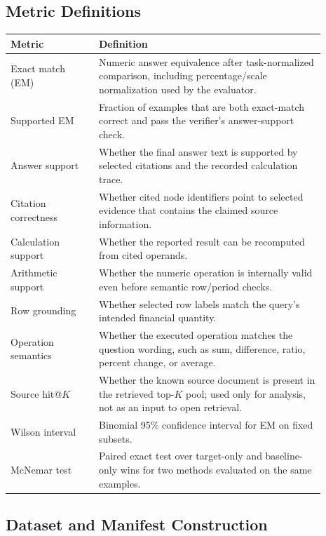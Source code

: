 \subsection{Metric Definitions}

\begin{center}
\small
\begin{tabular}{p{0.25\linewidth}p{0.64\linewidth}}
\hline
Metric & Definition \\
\hline
Exact match (EM) & Numeric answer equivalence after task-normalized comparison,
including percentage/scale normalization used by the evaluator. \\
Supported EM & Fraction of examples that are both exact-match correct and pass
the verifier's answer-support check. \\
Answer support & Whether the final answer text is supported by selected
citations and the recorded calculation trace. \\
Citation correctness & Whether cited node identifiers point to selected
evidence that contains the claimed source information. \\
Calculation support & Whether the reported result can be recomputed from cited
operands. \\
Arithmetic support & Whether the numeric operation is internally valid even
before semantic row/period checks. \\
Row grounding & Whether selected row labels match the query's intended
financial quantity. \\
Operation semantics & Whether the executed operation matches the question
wording, such as sum, difference, ratio, percent change, or average. \\
Source hit@\(K\) & Whether the known source document is present in the retrieved
top-\(K\) pool; used only for analysis, not as an input to open retrieval. \\
Wilson interval & Binomial 95\% confidence interval for EM on fixed subsets. \\
McNemar test & Paired exact test over target-only and baseline-only wins for
two methods evaluated on the same examples. \\
\hline
\end{tabular}
\end{center}

\subsection{Dataset and Manifest Construction}

